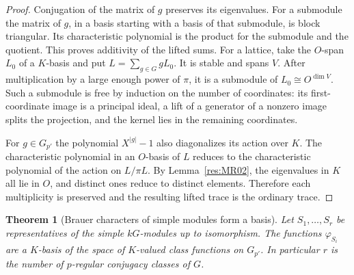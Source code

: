 \documentclass[11pt,oneside,openany]{book}
\newtheorem{theorem}{Theorem}[chapter]
\theoremstyle{definition}
\theoremstyle{remark}
\begin{document}
\begin{proof}
Conjugation of the matrix of \(g\) preserves its eigenvalues.
For a submodule the matrix of \(g\), in a basis starting with
a basis of that submodule, is block triangular. Its
characteristic polynomial is the product for the submodule
and the quotient. This proves additivity of the lifted sums.
For a lattice, take the \(O\)-span \(L_0\) of a \(K\)-basis and
put \(L=\sum_{g\in G}gL_0\). It is stable and spans \(V\).
After multiplication by a large enough power of \(\pi\), it is
a submodule of \(L_0\cong O^{\dim V}\). Such a submodule is free
by induction on the number of coordinates: its first-coordinate
image is a principal ideal, a lift of a generator of a nonzero
image splits the projection, and the kernel lies in the
remaining coordinates.

For \(g\in G_{p'}\) the polynomial \(X^{|g|}-1\) also diagonalizes
its action over \(K\). The characteristic polynomial in an
\(O\)-basis of \(L\) reduces to the characteristic polynomial
of the action on \(L/\pi L\). By Lemma~\ref{res:MR02}, the
eigenvalues in \(K\) all lie in \(O\), and distinct ones reduce
to distinct elements. Therefore each multiplicity is preserved
and the resulting lifted trace is the ordinary trace.
\end{proof}

\begin{theorem}[Brauer characters of simple modules form a basis]
\label{res:MR05}
Let \(S_1,\ldots,S_r\) be representatives of the simple
\(kG\)-modules up to isomorphism. The functions \(\varphi_{S_i}\)
are a \(K\)-basis of the space of \(K\)-valued class functions on
\(G_{p'}\). In particular \(r\) is the number of \(p\)-regular
conjugacy classes of \(G\).
\end{theorem}
\end{document}
